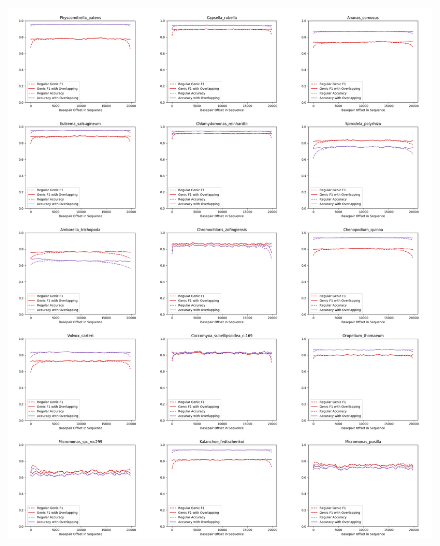 \documentclass{article}
\begin{document}
\begin{figure}[!h]
\centerline{\includegraphics[width=1.2\textwidth]{images/overlapping/montage_plants3}}
\end{figure}
\end{document}
